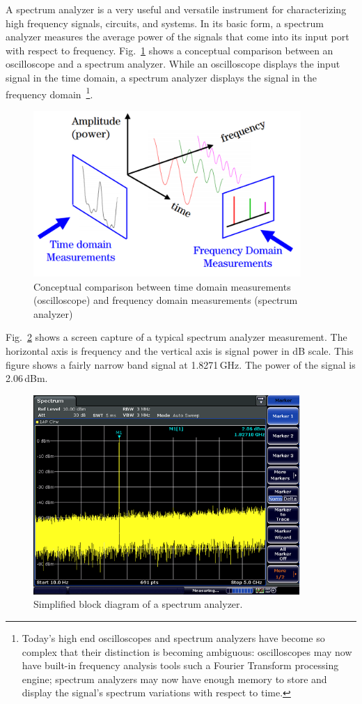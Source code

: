 \documentclass[letterpaper, 11pt]{article}
\begin{document}
A spectrum analyzer is a very useful and versatile instrument for characterizing high frequency signals, circuits, and systems. In its basic form, a spectrum analyzer measures the average power of the signals that come into its input port with respect to frequency. Fig.~\ref{fig:amp-time-frequency} shows a conceptual comparison between an oscilloscope and a spectrum analyzer. While an oscilloscope displays the input signal in the time domain, a spectrum analyzer displays the signal in the frequency domain~\footnote{Today’s high end oscilloscopes and spectrum analyzers have become so complex that their distinction is becoming ambiguous: oscilloscopes may now have built-in frequency analysis tools such a Fourier Transform processing engine; spectrum analyzers may now have enough memory to store and display the signal’s spectrum variations with respect to time.}. 

\begin{figure}[h]
	\centering
	\includegraphics[width=4in]{amp-time-frequency}
	\caption{Conceptual comparison between time domain measurements (oscilloscope) and frequency domain measurements (spectrum analyzer)~\cite{thomas-sa}}
	\label{fig:amp-time-frequency}
\end{figure}

Fig.~\ref{fig:sa-screen} shows a screen capture of a typical spectrum analyzer measurement. The horizontal axis is frequency and the vertical axis is signal power in dB scale. This figure shows a fairly narrow band signal at 1.8271\,GHz. The power of the signal is 2.06\,dBm.

\begin{figure}[h]
	\centering
	\includegraphics[width=4in]{sa-screen}
	\caption{Simplified block diagram of a spectrum analyzer.}
	\label{fig:sa-screen}
\end{figure}
\end{document}
